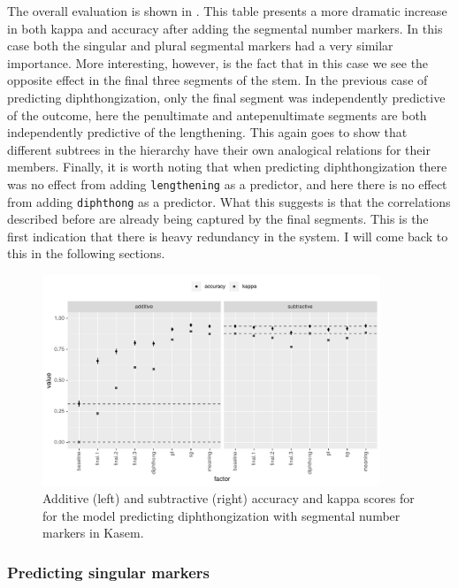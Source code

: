 \clearpage 
The overall evaluation is shown in . This table presents a more dramatic increase in both kappa and accuracy after adding the segmental number markers. In this case both the singular and plural segmental markers had a very similar importance. More interesting, however, is the fact that in this case we see the opposite effect in the final three segments of the stem. In the previous case of predicting diphthongization, only the final segment was independently predictive of the outcome, here the penultimate and antepenultimate segments are both independently predictive of the lengthening. This again goes to show that different subtrees in the hierarchy have their own analogical relations for their members. Finally, it is worth noting that when predicting diphthongization there was no effect from adding \texttt{lengthening} as a predictor, and here there is no effect from adding \texttt{diphthong} as a predictor. What this suggests is that the correlations described before are already being captured by the final segments. This is the first indication that there is heavy redundancy in the system. I will come back to this in the following sections.

\begin{figure}
  \centering
  \includegraphics[width=0.9\textwidth]{./figures/kasem/p-fi-length-sg-overall.pdf}
  \caption{Additive (left) and subtractive (right) accuracy and kappa scores for for the model predicting diphthongization with segmental number markers in Kasem.}\label{fig:overall-fi-length}
\end{figure}

\subsubsection{Predicting singular markers}


